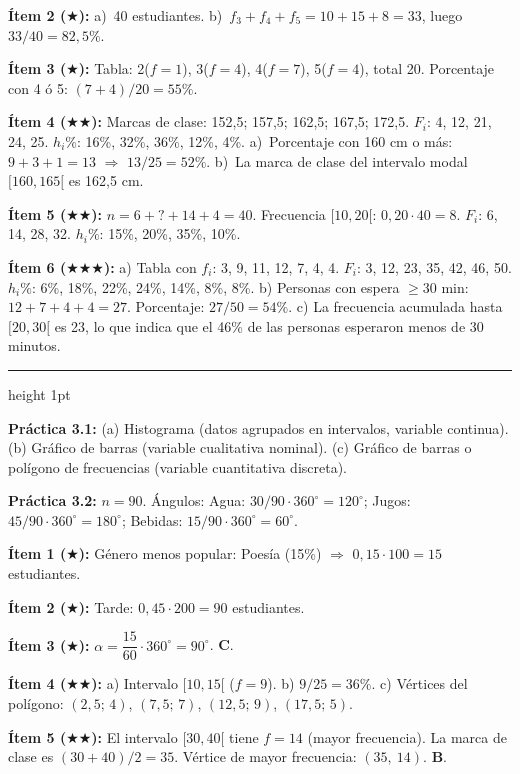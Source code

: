 \documentclass[11pt, letterpaper]{article}
\newcommand{\subbloque}[1]{%
  \vspace{14pt}
  \noindent{\large\bfseries\color{zenitnavy} #1}\par
  \vspace{4pt}\hrule height 1pt\vspace{8pt}}
\begin{document}
\textbf{\'Item 2 ($\bigstar$):}
a)~40 estudiantes. \; b)~$f_3+f_4+f_5 = 10+15+8 = 33$, luego $33/40 = 82{,}5\%$.

\textbf{\'Item 3 ($\bigstar$):}
Tabla: 2($f=1$), 3($f=4$), 4($f=7$), 5($f=4$), total 20.
Porcentaje con 4 \'o 5: $(7+4)/20 = 55\%$.

\textbf{\'Item 4 ($\bigstar\bigstar$):}
Marcas de clase: 152{,}5; 157{,}5; 162{,}5; 167{,}5; 172{,}5.
$F_i$: 4, 12, 21, 24, 25. $h_i\%$: 16\%, 32\%, 36\%, 12\%, 4\%.
a)~Porcentaje con 160 cm o m\'as: $9+3+1=13$ $\Rightarrow$ $13/25=52\%$.
b)~La marca de clase del intervalo modal $[160,165[$ es 162{,}5 cm.

\textbf{\'Item 5 ($\bigstar\bigstar$):}
$n = 6+\text{?}+14+4=40$. Frecuencia $[10,20[$: $0{,}20 \cdot 40 = 8$.
$F_i$: 6, 14, 28, 32. $h_i\%$: 15\%, 20\%, 35\%, 10\%.

\textbf{\'Item 6 ($\bigstar\bigstar\bigstar$):}
a) Tabla con $f_i$: 3, 9, 11, 12, 7, 4, 4. $F_i$: 3, 12, 23, 35, 42, 46, 50. $h_i\%$: 6\%, 18\%, 22\%, 24\%, 14\%, 8\%, 8\%.
b) Personas con espera $\geq 30$ min: $12+7+4+4=27$. Porcentaje: $27/50=54\%$.
c) La frecuencia acumulada hasta $[20,30[$ es 23, lo que indica que el 46\% de las personas esperaron menos de 30 minutos.

\subbloque{Secci\'on 3 --- Gr\'aficos estad\'isticos}

\textbf{Pr\'actica 3.1:}
(a) Histograma (datos agrupados en intervalos, variable continua).
(b) Gr\'afico de barras (variable cualitativa nominal).
(c) Gr\'afico de barras o pol\'igono de frecuencias (variable cuantitativa discreta).

\textbf{Pr\'actica 3.2:} $n=90$. \'Angulos: Agua: $30/90\cdot360^\circ=120^\circ$; Jugos: $45/90\cdot360^\circ=180^\circ$; Bebidas: $15/90\cdot360^\circ=60^\circ$.

\textbf{\'Item 1 ($\bigstar$):} G\'enero menos popular: Poes\'ia (15\%) $\Rightarrow$ $0{,}15\cdot100=15$ estudiantes.

\textbf{\'Item 2 ($\bigstar$):} Tarde: $0{,}45\cdot200=90$ estudiantes.

\textbf{\'Item 3 ($\bigstar$):} $\alpha = \dfrac{15}{60}\cdot360^\circ = 90^\circ$. \textbf{C}.

\textbf{\'Item 4 ($\bigstar\bigstar$):}
a) Intervalo $[10,15[$ ($f=9$). b) $9/25=36\%$. c) V\'ertices del pol\'igono: $(2{,}5;\,4)$, $(7{,}5;\,7)$, $(12{,}5;\,9)$, $(17{,}5;\,5)$.

\textbf{\'Item 5 ($\bigstar\bigstar$):} El intervalo $[30,40[$ tiene $f=14$ (mayor frecuencia). La marca de clase es $(30+40)/2=35$. V\'ertice de mayor frecuencia: $(35,\ 14)$. \textbf{B}.
\end{document}
